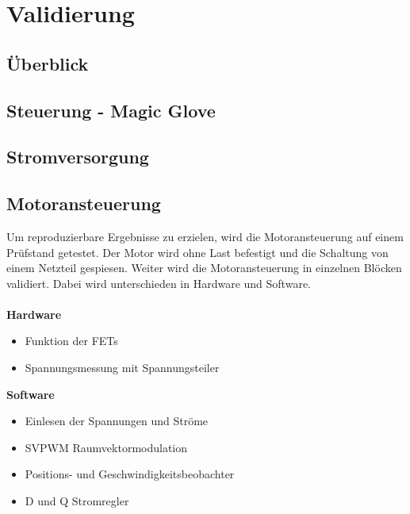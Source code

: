 \chapter{Validierung} 

\section{Überblick}

\section{Steuerung - Magic Glove}

\section{Stromversorgung}

\section{Motoransteuerung}
Um reproduzierbare Ergebnisse zu erzielen, wird die Motoransteuerung auf einem Prüfstand getestet. Der Motor wird ohne Last befestigt und die Schaltung von einem Netzteil gespiesen. Weiter wird die Motoransteuerung in einzelnen Blöcken validiert. Dabei wird unterschieden in Hardware und Software.\\
\\
\textbf{Hardware}
\begin{itemize}
	\item Funktion der FETs
	\item Spannungsmessung mit Spannungsteiler
\end{itemize}
\textbf{Software}
\begin{itemize}
	\item Einlesen der Spannungen und Ströme
	\item SVPWM Raumvektormodulation
	\item Positions- und Geschwindigkeitsbeobachter
	\item D und Q Stromregler
\end{itemize}

